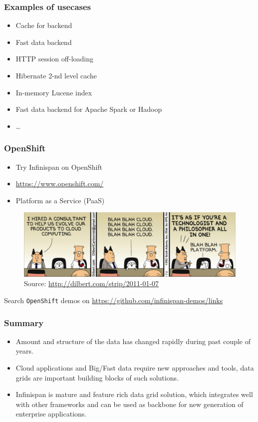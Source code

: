 \documentclass[10pt,utf8]{beamer}
\begin{document}
\begin{frame}
	\frametitle{Examples of usecases}
	\begin{itemize}
		\item Cache for backend 
		\item Fast data backend
		\item HTTP session off-loading
		\item Hibernate 2-nd level cache
		\item In-memory Lucene index
		\item Fast data backend for Apache Spark or Hadoop
		\item \dots
	\end{itemize}
\end{frame}


\begin{frame}
	\frametitle{OpenShift}
	\begin{itemize}
		\item Try Infinispan on OpenShift
		\item \color{blue}\url{https://www.openshift.com/}\color{black} 
		\item Platform as a Service (PaaS)
	\end{itemize}
	\begin{figure}
		\centering
		\includegraphics[width=12cm]{./img/platform.eps}
		\caption{\tiny{Source: \url{http://dilbert.com/strip/2011-01-07}}}
	\end{figure}
	\vspace{-0.5cm}
	Search \texttt{OpenShift} demos on \color{blue}\url{https://github.com/infinispan-demos/links}\color{black}
\end{frame}

\begin{frame}
	\frametitle{Summary}
	\begin{itemize}
		\pause
		\item Amount and structure of the data has changed rapidly during past couple of years.
		\pause
		\item Cloud applications and Big/Fast data require new approaches and tools, data grids are important building blocks of such solutions.
		\pause
		\item Infinispan is mature and feature rich data grid solution, which integrates well with other frameworks and can be used as backbone for new 
	 generation of enterprise applications.
	\end{itemize}
\end{frame}
\end{document}
